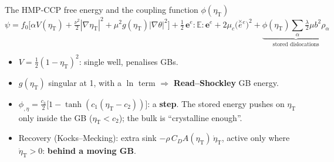 \documentclass[10pt,aspectratio=169]{beamer}
\begin{document}
\begin{frame}{The HMP-CCP free energy and the coupling function $\phi(\eta_{\text{T}})$}
  \footnotesize
  \[
    \psi = f_0\Big[\alpha V(\eta_{\text{T}}) + \tfrac{\nu^2}{2}|\nabla\eta_{\text{T}}|^2
      + \mu^2 g(\eta_{\text{T}})|\nabla\theta|^2\Big]
      + \tfrac12\,\boldsymbol{e}^e\!:\!\mathbb{E}\!:\!\boldsymbol{e}^e
      + 2\mu_c\big(\overset{\times}{e}{}^{e}\big)^2
      + \underbrace{\phi(\eta_{\text{T}})\sum_\alpha \tfrac{\lambda}{2}\mu b^2\rho_\alpha}_{\text{stored dislocations}}
  \]
  \vspace{-0.6em}

      \begin{itemize}
        \item $V = \tfrac12(1-\eta_{\text{T}})^2$: single well, penalises GBs.
        \item $g(\eta_{\text{T}})$ singular at 1, with a $\ln$ term $\Rightarrow$
          \textbf{Read--Shockley} GB energy.
        \item $\phi_{,\eta} = \tfrac{c_3}{2}\big[1-\tanh(c_1(\eta_{\text{T}}-c_2))\big]$: a
          \textbf{step}. The stored energy pushes on $\eta_{\text{T}}$ only inside the GB
          ($\eta_{\text{T}}<c_2$); the bulk is ``crystalline enough''.
        \item Recovery (Kocks--Mecking): extra sink $-\rho\,C_D A(\eta_{\text{T}})\,\dot\eta_{\text{T}}$,
          active only where $\dot\eta_{\text{T}}>0$: \textbf{behind a moving GB}.
      \end{itemize}

\end{frame}
\end{document}
